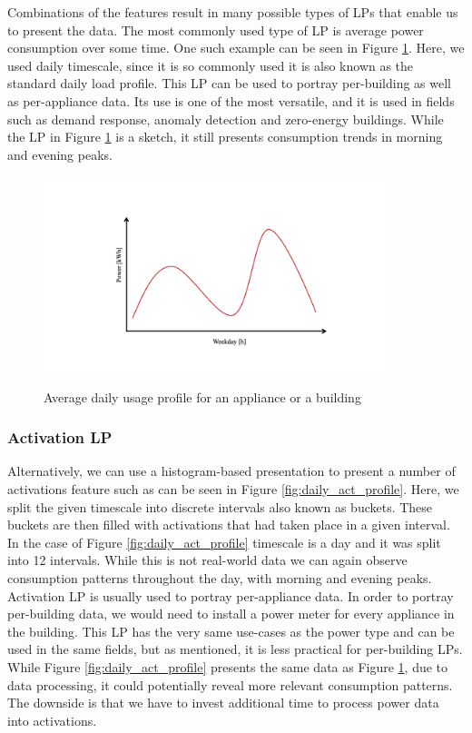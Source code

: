 Combinations of the features result in many possible types of LPs that enable us to present the data.
The most commonly used type of LP is average power consumption over some time.
One such example can be seen in Figure \ref{fig:daily_power_profile}. 
Here, we used daily timescale, since it is so commonly used it is also known as the standard daily load profile. 
This LP can be used to portray per-building as well as per-appliance data.
Its use is one of the most versatile, and it is used in fields such as demand response, anomaly detection and zero-energy buildings.
While the LP in Figure \ref{fig:daily_power_profile} is a sketch, it still presents consumption trends in morning and evening peaks.
\begin{figure}[H]
	\centering
	\caption{Average daily usage profile for an appliance or a building}
	\includegraphics[width=0.9\textwidth]{Figures/profile_sketches/Slide1.png}
	\label{fig:daily_power_profile}
\end{figure}

\subsubsection{Activation LP}
Alternatively, we can use a histogram-based presentation to present a number of activations feature such as can be seen in Figure \ref{fig:daily_act_profile}.
Here, we split the given timescale into discrete intervals also known as buckets. 
These buckets are then filled with activations that had taken place in a given interval. 
In the case of Figure \ref{fig:daily_act_profile} timescale is a day and it was split into 12 intervals.
While this is not real-world data we can again observe consumption patterns throughout the day, with morning and evening peaks. 
Activation LP is usually used to portray per-appliance data. 
In order to portray per-building data, we would need to install a power meter for every appliance in the building.
This LP has the very same use-cases as the power type and can be used in the same fields, but as mentioned, it is less practical for per-building LPs.
While Figure \ref{fig:daily_act_profile} presents the same data as Figure \ref{fig:daily_power_profile},
due to data processing, it could potentially reveal more relevant consumption patterns.
The downside is that we have to invest additional time to process power data into activations.

